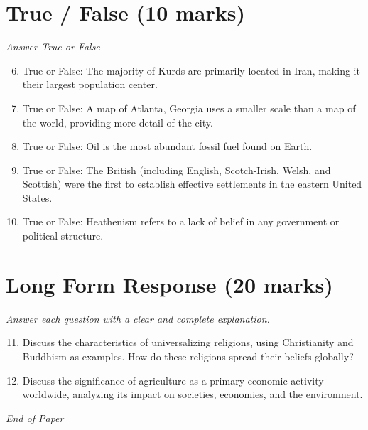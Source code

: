 \documentclass[12pt]{article}
\begin{document}
\section*{True / False (10 marks)}
\textit{Answer True or False}
\begin{enumerate}[label=\arabic*.]
\setcounter{enumi}{5}
\item True or False: The majority of Kurds are primarily located in Iran, making it their largest population center.
\item True or False: A map of Atlanta, Georgia uses a smaller scale than a map of the world, providing more detail of the city.
\item True or False: Oil is the most abundant fossil fuel found on Earth.
\item True or False: The British (including English, Scotch-Irish, Welsh, and Scottish) were the first to establish effective settlements in the eastern United States.
\item True or False: Heathenism refers to a lack of belief in any government or political structure.
\end{enumerate}

\section*{Long Form Response (20 marks)}
\textit{Answer each question with a clear and complete explanation.}
\begin{enumerate}[label=\arabic*.]
\setcounter{enumi}{10}
\item Discuss the characteristics of universalizing religions, using Christianity and Buddhism as examples. How do these religions spread their beliefs globally?
\item Discuss the significance of agriculture as a primary economic activity worldwide, analyzing its impact on societies, economies, and the environment.
\end{enumerate}

\vfill
\noindent\textit{End of Paper}
\end{document}
